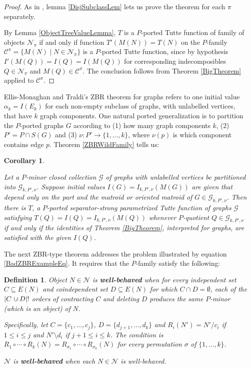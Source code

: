 \documentclass[12pt,leqno]{amsart}
\newtheorem{cor}[lem]{Corollary}
\newtheorem{definition}[lem]{Definition}
\theoremstyle{remark}
\newcommand{\dunion}
{\mbox{\hbox{\hskip6pt$\cdot$\hskip-5.50pt$\cup$\hskip2pt}}}
\begin{document}
\begin{proof}
As in \cite{Ellis-Monaghan-Traldi}, lemma
\ref{DisjSubclassLem} lets us prove the
theorem for each $\pi$ separately.


By Lemma \ref{ObjectTreeValueLemma}, $T$ is a 
$P$-ported Tutte function of family
of objects $\mathcal{N}_{\pi}$ if and only
if function $T'(M(N))=T(N)$ on the $P$-family 
$\mathcal{C}^{\pi}=\{M(N)\mid N\in\mathcal{N}_{\pi}\}$ is a $P$-ported Tutte 
function, since by hypothesis 
$I'(M(Q))=I(Q)=I(M(Q))$ for corresponding
indecomposibles $Q\in\mathcal{N}_{\pi}$ and 
$M(Q)\in\mathcal{C}^{\pi}$.
The conclusion follows
from Theorem \ref{BigTheorem} applied to $\mathcal{C}^{\pi}$.
\end{proof}


Ellis-Monaghan and Traldi's ZBR theorem for graphs 
refers to one initial value $\mathcal{\alpha}_k=I(E_k)$
for each non-empty subclass of graphs, with unlabelled vertices, that
have $k$ graph components.  One natural ported generalization
is to partition the $P$-ported graphs $G$
according to (1) how many
graph components $k$, (2) $P'=P\cap S(G)$ and (3)
$\nu:P'\rightarrow\{1,\ldots,k\}$, where $\nu(p)$ is which
component contains edge $p$.  Theorem
\ref{ZBRWildFamily} tells us:

\begin{cor}
\label{PZBRGraphCor1}

Let a $P$-minor closed collection $\mathcal{G}$ of graphs with unlabelled
vertices be partitioned into $\mathcal{G}_{k,P',\nu}$.  Suppose initial
values $I(G)=I_{k,P',\nu}(M(G))$ are given that depend only on the 
part and the matroid or oriented matroid of $G\in\mathcal{G}_{k,P',\nu}$.
Then there is $T$, 
a $P$-ported separator-strong parametrized Tutte function
of graphs $\mathcal{G}$ satisfying $T(Q)=I(Q)=I_{k,P',\nu}(M(Q))$ whenever
$P$-quotient $Q\in\mathcal{G}_{k,P',\nu}$ if and only if the identities
of Theorem \ref{BigTheorem}, interpreted for graphs, are satisfied with 
the given $I(Q)$.
\end{cor}

The next ZBR-type theorem  addresses the problem 
illustrated by equation \eqref{BadZBRExampleEq}. It requires that
the $P$-family satisfy the following:

\begin{definition}
Object $N\in\mathcal{N}$ is \textbf{well-behaved} when
for every independent set $C\subseteq E(N)$ and
coindependent set $D\subseteq E(N)$ for which
$C\cap D=\emptyset$, each of the
$|C\dunion D|!$ orders 
of contracting $C$ and deleting $D$ produces the
same $P$-minor (which is an object) of $N$.

Specifically, let 
$C=\{c_1,\ldots,c_j\}$,
$D=\{d_{j+1},\ldots,d_k\}$
and $R_i(N')=N'/c_i$ if $1\le i \le j$
and $N'\setminus d_i$ if $j+1\le i \le k$.
The condition is 
$R_1\circ\cdots\circ R_k(N) = R_{\sigma_1}\circ\cdots\circ R_{\sigma_k}(N)$
for every permutation $\sigma$ of $\{1,\ldots,k\}$.

$\mathcal{N}$ is \textbf{well-behaved} when 
each $N\in\mathcal{N}$ is well-behaved.

\end{definition}
\end{document}
